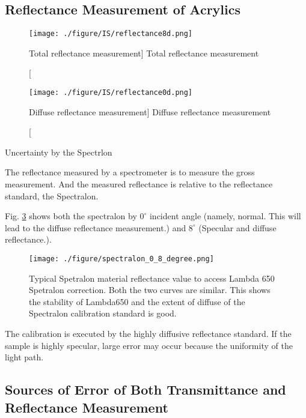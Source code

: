 \subsection{Reflectance Measurement of Acrylics}


\begin{figure}
    \centering
    \texttt{[image: ./figure/IS/reflectance8d.png]}
    \caption
    [Total reflectance measurement]
    {Total reflectance measurement}
    \label{fig:reflectance8d.png}
    \end{figure}


\begin{figure}
    \centering
    \texttt{[image: ./figure/IS/reflectance0d.png]}
    \caption
    [Diffuse reflectance measurement]
    {Diffuse reflectance measurement}
    \label{fig:reflectance0d.png}
    \end{figure}



Uncertainty by the Spectrlon

The reflectance measured by a spectrometer is to measure the gross measurement. And the measured
reflectance is relative to the reflectance standard, the Spectralon.

Fig. \ref{fig:spectralon_0_8_degree.png} shows both the spectralon by $0^\circ$ incident angle (namely, normal. This will lead to the diffuse
reflectance measurement.) and $8^\circ$ (Specular and diffuse reflectance.).


\begin{figure}
    \centering
    \texttt{[image: ./figure/spectralon\_0\_8\_degree.png]}
    \caption[Typical Spetralon material reflectance value to access Lambda 650 Spetralon correction]{Typical Spetralon material reflectance value to access Lambda 650 Spetralon correction. Both the two curves are similar. This shows the stability of Lambda650 and the extent of diffuse of the Spectralon calibration standard is good.}
    \label{fig:spectralon_0_8_degree.png}
    \end{figure}


The calibration is executed by the highly diffusive reflectance standard.
If the sample is highly specular, large error may occur because the uniformity of the light path.


\subsection{Sources of Error of Both Transmittance and Reflectance Measurement}

